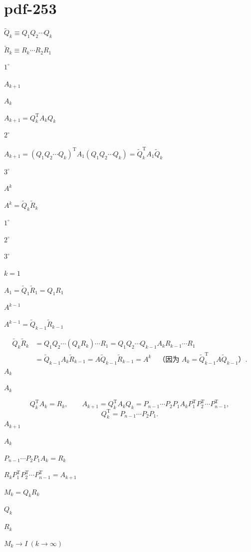 \documentclass[UTF8,fontset=fandol]{ctexart}
\begin{document}
\section*{pdf-253}
$\widetilde Q_k\equiv Q_1Q_2\cdots Q_k$\par
$\widetilde R_k\equiv R_k\cdots R_2R_1$\par
$1^\circ$\par
$A_{k+1}$\par
$A_k$\par
$A_{k+1}=Q_k^{\mathrm T}A_kQ_k$\par
$2^\circ$\par
$A_{k+1}=(Q_1Q_2\cdots Q_k)^{\mathrm T}A_1(Q_1Q_2\cdots Q_k)=\widetilde Q_k^{\mathrm T}A_1\widetilde Q_k$\par
$3^\circ$\par
$A^k$\par
$A^k=\widetilde Q_k\widetilde R_k$\par
$1^\circ$\par
$2^\circ$\par
$3^\circ$\par
$k=1$\par
$A_1=\widetilde Q_1\widetilde R_1=Q_1R_1$\par
$A^{k-1}$\par
$A^{k-1}=\widetilde Q_{k-1}\widetilde R_{k-1}$\par
\[
\begin{aligned}
\widetilde Q_k\widetilde R_k
&=Q_1Q_2\cdots(Q_kR_k)\cdots R_1
=Q_1Q_2\cdots Q_{k-1}A_kR_{k-1}\cdots R_1\\
&=\widetilde Q_{k-1}A_k\widetilde R_{k-1}
=A\widetilde Q_{k-1}\widetilde R_{k-1}=A^k
\quad\text{（因为 }A_k=\widetilde Q_{k-1}^{\mathrm T}A\widetilde Q_{k-1}\text{）}.
\end{aligned}
\]
$A_k$\par
$A_k$\par
\[
Q_k^{\mathrm T}A_k=R_k,\qquad
A_{k+1}=Q_k^{\mathrm T}A_kQ_k=P_{n-1}\cdots P_2P_1A_kP_1^{\mathrm T}P_2^{\mathrm T}\cdots P_{n-1}^{\mathrm T},
\]
\[
Q_k^{\mathrm T}=P_{n-1}\cdots P_2P_1.
\]
$A_{k+1}$\par
$A_k$\par
$P_{n-1}\cdots P_2P_1A_k=R_k$\par
$R_kP_1^{\mathrm T}P_2^{\mathrm T}\cdots P_{n-1}^{\mathrm T}=A_{k+1}$\par
$M_k=Q_kR_k$\par
$Q_k$\par
$R_k$\par
$M_k\to I\ (k\to\infty)$\par
\end{document}
